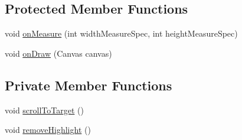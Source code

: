 \subsection*{Protected Member Functions}
\begin{DoxyCompactItemize}
\item 
void \hyperlink{classch_1_1zhaw_1_1ba10__bsha__1_1_1ime_1_1CandidateView_ac29e64dd3d1acc11c93208fcffe41f0a}{onMeasure} (int widthMeasureSpec, int heightMeasureSpec)
\item 
void \hyperlink{classch_1_1zhaw_1_1ba10__bsha__1_1_1ime_1_1CandidateView_a81383d3ca29122604138b340746eabe5}{onDraw} (Canvas canvas)
\end{DoxyCompactItemize}
\subsection*{Private Member Functions}
\begin{DoxyCompactItemize}
\item 
void \hyperlink{classch_1_1zhaw_1_1ba10__bsha__1_1_1ime_1_1CandidateView_a300599eba91c613b0354b24f7414c1be}{scrollToTarget} ()
\item 
void \hyperlink{classch_1_1zhaw_1_1ba10__bsha__1_1_1ime_1_1CandidateView_a08f3ae896df1462fb9af1ffd5eeca266}{removeHighlight} ()
\end{DoxyCompactItemize}
